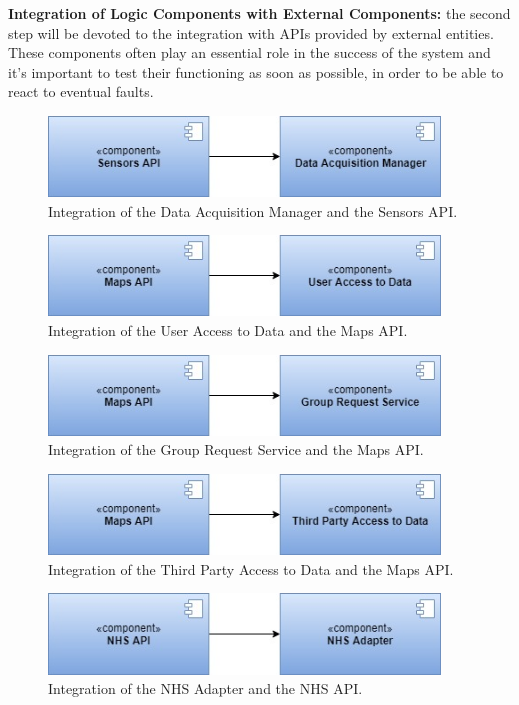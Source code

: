 \noindent\textbf{Integration of Logic Components with External Components:} the second step will be devoted to the integration with APIs provided by external entities. These components often play an essential role in the success of the system and it's important to test their functioning as soon as possible, in order to be able to react to eventual faults.
\begin{figure}[H]
    \centering
    \includegraphics[width=295pt]{images/IntegrationSequence/TrackMe-Integration_sequence3.jpg}
    \caption{Integration of the Data Acquisition Manager and the Sensors API.}
\end{figure}
\begin{figure}[H]
    \centering
    \includegraphics[width=295pt]{images/IntegrationSequence/TrackMe-Integration_sequence4.jpg}
    \caption{Integration of the User Access to Data and the Maps API.}
\end{figure}
\begin{figure}[H]
    \centering
    \includegraphics[width=295pt]{images/IntegrationSequence/TrackMe-Integration_sequence5.jpg}
    \caption{Integration of the Group Request Service and the Maps API.}
\end{figure}
\begin{figure}[H]
    \centering
    \includegraphics[width=295pt]{images/IntegrationSequence/TrackMe-Integration_sequence6.jpg}
    \caption{Integration of the Third Party Access to Data and the Maps API.}
\end{figure}
\begin{figure}[H]
    \centering
    \includegraphics[width=295pt]{images/IntegrationSequence/TrackMe-Integration_sequence8.jpg}
    \caption{Integration of the NHS Adapter and the NHS API.}
\end{figure}
